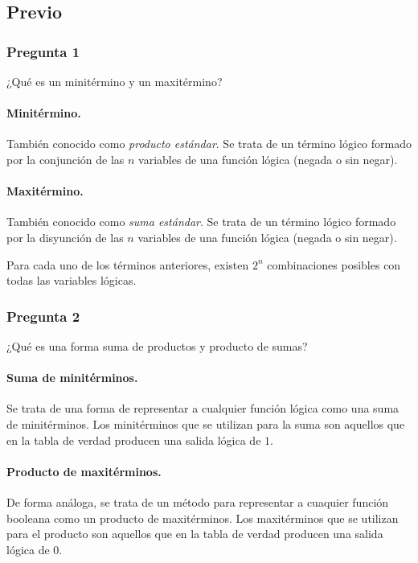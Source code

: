 \documentclass[../procedimientos.tex]{subfiles}
\begin{document}
\subsection{Previo}
\subsubsection*{Pregunta 1}
\begin{em}
  ¿Qué es un minitérmino y un maxitérmino?
\end{em}

\paragraph{Minitérmino.} También conocido como \textit{producto estándar}.  Se 
trata de un término lógico formado por la conjunción de las $n$ variables de 
una función lógica (negada o sin negar).

\paragraph{Maxitérmino.} También conocido como \textit{suma estándar}.  Se 
trata de un término lógico formado por la disyunción de las $n$ variables de 
una función lógica (negada o sin negar).

Para cada uno de los términos anteriores, existen $2^n$ combinaciones posibles 
con todas las variables lógicas.

\subsubsection*{Pregunta 2}
\begin{em}
  ¿Qué es una forma suma de productos y producto de sumas?
\end{em}

\paragraph{Suma de minitérminos.} Se trata de una forma de representar a 
cualquier función lógica como una suma de minitérminos. Los minitérminos que 
se utilizan para la suma son aquellos que en la tabla de verdad producen una 
salida lógica de $1$.

\paragraph{Producto de maxitérminos.} De forma análoga, se trata de un método 
para representar a cuaquier función booleana como un producto de maxitérminos.  
Los maxitérminos que se utilizan para el producto son aquellos que en la tabla 
de verdad producen una salida lógica de $0$.
\end{document}
